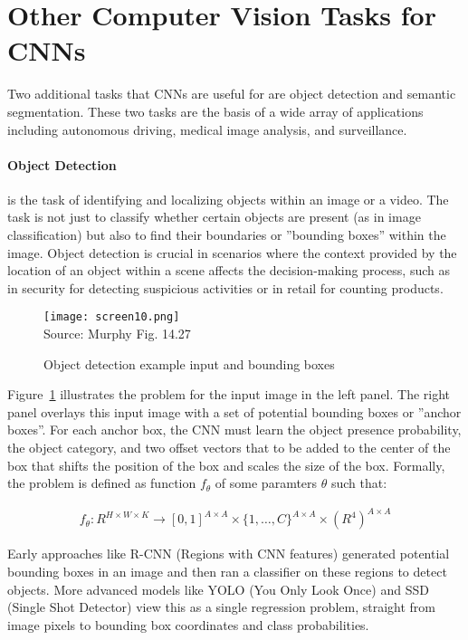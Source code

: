 \section{Other Computer Vision Tasks for CNNs}

Two additional tasks that CNNs are useful for are object detection and semantic segmentation. These two tasks are the basis of a wide array of applications including autonomous driving, medical image analysis, and surveillance. 

\paragraph*{Object Detection} is the task of identifying and localizing objects within an image or a video. The task is not just to classify whether certain objects are present (as in image classification) but also to find their boundaries or ''bounding boxes'' within the image. Object detection is crucial in scenarios where the context provided by the location of an object within a scene affects the decision-making process, such as in security for detecting suspicious activities or in retail for counting products.

\begin{figure}
\centering
\texttt{[image: screen10.png]} \\

\scriptsize Source: Murphy Fig. 14.27
\normalsize
\caption{Object detection example input and bounding boxes}
\label{fig:screen10_chap16}
\end{figure}

Figure~\ref{fig:screen10_chap16} illustrates the problem for the input image in the left panel. The right panel overlays this input image with a set of potential bounding boxes or ''anchor boxes''. For each anchor box, the CNN must learn the object presence probability, the object category, and two offset vectors that to be added to the center of the box that shifts the position of the box and scales the size of the box. Formally, the problem is defined as function $f_\theta$ of some paramters $\theta$ such that:

\begin{align*}
f_\theta: R^{H\times W \times K} \rightarrow [0,1]^{A \times A} \times \{1, \ldots, C\}^{A \times A} \times (R^4)^{A \times A}
\end{align*}


Early approaches like R-CNN (Regions with CNN features) generated potential bounding boxes in an image and then ran a classifier on these regions to detect objects. More advanced models like YOLO (You Only Look Once) and SSD (Single Shot Detector) view this as a single regression problem, straight from image pixels to bounding box coordinates and class probabilities.


